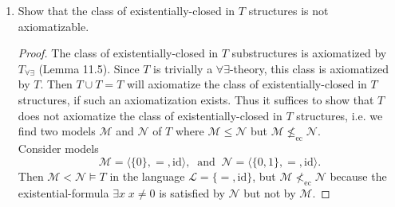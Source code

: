 \documentclass{article}
\begin{document}
\begin{enumerate}[label={\bf Q\arabic*:}]
\begin{enumerate}
      \item Show that the class of existentially-closed in $T$ structures
        is not axiomatizable.
        \begin{proof}
          The class of existentially-closed in $T$ substructures is
          axiomatized by $T_{\forall\exists}$ (Lemma 11.5). Since $T$ is
          trivially a $\forall\exists$-theory, this class is axiomatized by
          $T$. Then $T\cup T=T$ will axiomatize the class of
          existentially-closed in $T$ structures, if such an axiomatization
          exists. Thus it suffices to show that $T$ does not axiomatize the
          class of existentially-closed in $T$ structures, i.e. we find two
          models $\mathcal{M}$ and $\mathcal{N}$ of $T$ where
          $\mathcal{M}\leq\mathcal{N}$ but
          $\mathcal{M}\not\leq_{\text{ec}}\mathcal{N}$. \\

          Consider models
          \[\mathcal{M}= \langle\{0\},=,\text{id}\rangle,\;\;
            \text{and}\;\; \mathcal{N}=
            \langle\{0,1\},=,\text{id}\rangle.\]
          Then $\mathcal{M}<\mathcal{N}\models T$ in the language
          $\mathcal{L}=\{=,\text{id}\}$, but
          $\mathcal{M}\not<_{\text{ec}}\mathcal{N}$ because the
          existential-formula $\exists x\; x\neq 0$ is satisfied by
          $\mathcal{N}$ but not by $\mathcal{M}$.
        \end{proof}
    \end{enumerate}
\end{enumerate}
\end{document}
